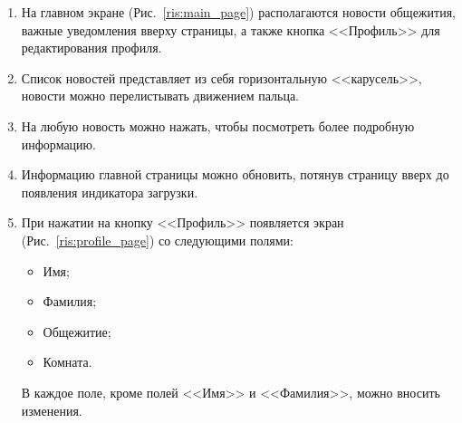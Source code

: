 \documentclass{../includes/TechDoc}
\begin{document}
    \begin{enumerate}
        \item На главном экране (Рис.~\ref{ris:main_page}) располагаются новости общежития, важные уведомления вверху страницы,
        а также кнопка <<Профиль>> для редактирования профиля.
        \item Список новостей представляет из себя горизонтальную <<карусель>>, новости можно перелистывать движением пальца.
        \item На любую новость можно нажать, чтобы посмотреть более подробную информацию.
        \item Информацию главной страницы можно обновить, потянув страницу вверх до появления индикатора загрузки.

        \item При нажатии на кнопку <<Профиль>> появляется экран (Рис.~\ref{ris:profile_page}) со следующими полями:
        \begin{itemize}[noitemsep]
            \item Имя;
            \item Фамилия;
            \item Общежитие;
            \item Комната.
        \end{itemize}
        В каждое поле, кроме полей <<Имя>> и <<Фамилия>>, можно вносить изменения.
        \begin{figure}[h]
            \begin{center}
                \begin{minipage}[h]{0.33\linewidth}

\end{minipage}
\end{center}
\end{figure}
\end{enumerate}
\end{document}
